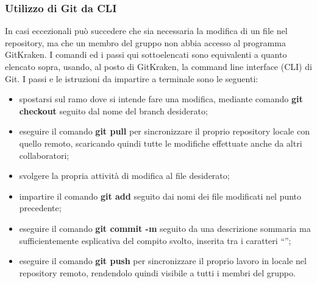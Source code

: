 \subsubsection{Utilizzo di Git da CLI}
In casi eccezionali può succedere che sia necessaria la modifica di un file nel repository, ma che un membro del gruppo {\Gruppo} non abbia accesso al programma GitKraken. I comandi ed i passi qui sottoelencati sono equivalenti a quanto elencato sopra, usando, al posto di GitKraken, la command line interface (CLI) di Git. I passi e le istruzioni da impartire a terminale sono le seguenti:
\begin{itemize}
	\item spostarsi sul ramo dove si intende fare una modifica, mediante comando \textbf{git checkout} seguito dal nome del branch desiderato;
	\item eseguire il comando \textbf{git pull} per sincronizzare il proprio repository locale con quello remoto, scaricando quindi tutte le modifiche effettuate anche da altri collaboratori;
	\item svolgere la propria attività di modifica al file desiderato;
	\item impartire il comando \textbf{git add} seguito dai nomi dei file modificati nel punto precedente;
	\item eseguire il comando \textbf{git commit -m} seguito da una descrizione sommaria ma sufficientemente esplicativa del compito svolto, inserita tra i caratteri “”;
	\item eseguire il comando \textbf{git push} per sincronizzare il proprio lavoro in locale nel repository remoto, rendendolo quindi visibile a tutti i membri del gruppo.
\end{itemize}


